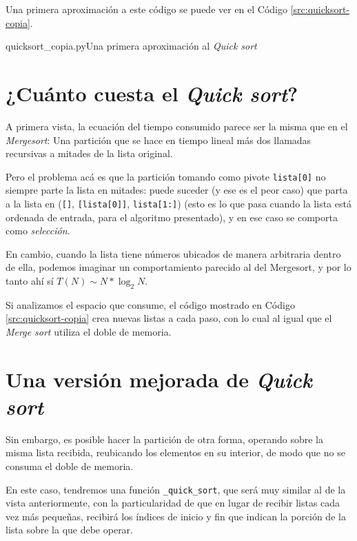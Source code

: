 Una primera aproximación a este código se puede ver en el Código
\ref{src:quicksort-copia}.

\begin{codigo}{quicksort\_copia.py}{Una primera aproximación al {\it Quick sort}}

\label{src:quicksort-copia}
\end{codigo}

\section{¿Cuánto cuesta el {\it Quick sort}?}

A primera vista, la ecuación del tiempo consumido parece ser la misma que
en el {\it Mergesort}: Una partición que se hace en tiempo lineal más dos
llamadas recursivas a mitades de la lista original.

Pero el problema acá es que la partición tomando como pivote
\lstinline!lista[0]! no siempre parte la lista en mitades: puede suceder (y
ese es el peor caso) que parta a la lista en (\lstinline![]!,
\lstinline![lista[0]]!, \lstinline!lista[1:]!) (esto es lo que pasa cuando
la lista está ordenada de entrada, para el algoritmo presentado), y en ese
caso se comporta como {\it selección}.

En cambio, cuando la lista tiene números ubicados de manera arbitraria
dentro de ella, podemos imaginar un comportamiento parecido al del
Mergesort, y por lo tanto ahí sí $T(N) \sim N * \log_2 N$.

Si analizamos el espacio que consume, el código mostrado en Código
\ref{src:quicksort-copia} crea nuevas listas a cada paso, con lo cual al
igual que el {\it Merge sort} utiliza el doble de memoria.

\section{Una versión mejorada de {\it Quick sort}}

Sin embargo, es posible hacer la partición de otra forma, operando sobre la
misma lista recibida, reubicando los elementos en su interior, de modo que
no se consuma el doble de memoria.

En este caso, tendremos una función \lstinline!_quick_sort!, que será muy
similar al de la vista anteriormente, con la particularidad de que en lugar
de recibir listas cada vez más pequeñas, recibirá los índices de inicio y
fin que indican la porción de la lista sobre la que debe operar.

